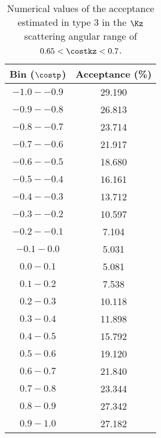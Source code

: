\begin{table}[!h] 
  \begin{center}
  \caption{Numerical values of the acceptance estimated in type 3 in the $\Kz$ scattering angular range of \textbf{$0.65<\costkz<0.7$}.}
  \centering
  \begin{threeparttable}
    \begin{tabular}{cc}
    Bin ($\costp$) & Acceptance (\%) \\
    \midrule\midrule
    $-1.0 - -0.9$ & 29.190 \\
    \midrule
    $-0.9 - -0.8$ & 26.813 \\
    \midrule
    $-0.8 - -0.7$ & 23.714 \\
    \midrule
    $-0.7 - -0.6$ & 21.917 \\
    \midrule
    $-0.6 - -0.5$ & 18.680 \\
    \midrule
    $-0.5 - -0.4$ & 16.161 \\
    \midrule
    $-0.4 - -0.3$ & 13.712 \\
    \midrule
    $-0.3 - -0.2$ & 10.597 \\
    \midrule
    $-0.2 - -0.1$ & 7.104 \\
    \midrule
    $-0.1 - 0.0$ & 5.031 \\
    \midrule
    $0.0 - 0.1$ & 5.081 \\
    \midrule
    $0.1 - 0.2$ & 7.538 \\
    \midrule
    $0.2 - 0.3$ & 10.118 \\
    \midrule
    $0.3 - 0.4$ & 11.898 \\
    \midrule
    $0.4 - 0.5$ & 15.792 \\
    \midrule
    $0.5 - 0.6$ & 19.120 \\
    \midrule
    $0.6 - 0.7$ & 21.840 \\
    \midrule
    $0.7 - 0.8$ & 23.344 \\
    \midrule
    $0.8 - 0.9$ & 27.342 \\
    \midrule
    $0.9 - 1.0$ & 27.182 \\
    \end{tabular}
  \end{threeparttable}
  \label{tab-Pl-acc_33}
  \end{center}
\end{table}

